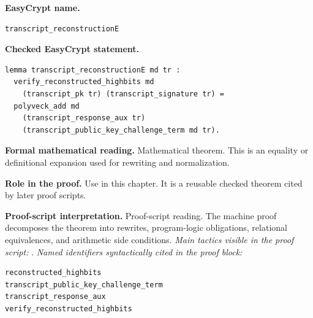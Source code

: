 \begin{formaltheorem}
\noindent\textbf{EasyCrypt name.}
\begin{lstlisting}[language=EasyCrypt,basicstyle=\ttfamily\scriptsize]
transcript_reconstructionE
\end{lstlisting}
\noindent\textbf{Checked EasyCrypt statement.}
\begin{lstlisting}[language=EasyCrypt,basicstyle=\ttfamily\scriptsize]
lemma transcript_reconstructionE md tr :
  verify_reconstructed_highbits md
    (transcript_pk tr) (transcript_signature tr) =
  polyveck_add md
    (transcript_response_aux tr)
    (transcript_public_key_challenge_term md tr).
\end{lstlisting}
\noindent\textbf{Formal mathematical reading.}
Mathematical theorem. This is an equality or definitional expansion used for rewriting and normalization.

\noindent\textbf{Role in the proof.}
Use in this chapter. It is a reusable checked theorem cited by later proof scripts.

\noindent\textbf{Proof-script interpretation.}
Proof-script reading. The machine proof decomposes the theorem into rewrites, program-logic obligations, relational equivalences, and arithmetic side conditions.
\emph{Main tactics visible in the proof script:} .
\emph{Named identifiers syntactically cited in the proof block:}
\begin{lstlisting}[language=EasyCrypt,basicstyle=\ttfamily\scriptsize]
reconstructed_highbits
transcript_public_key_challenge_term
transcript_response_aux
verify_reconstructed_highbits
\end{lstlisting}

\end{formaltheorem}

